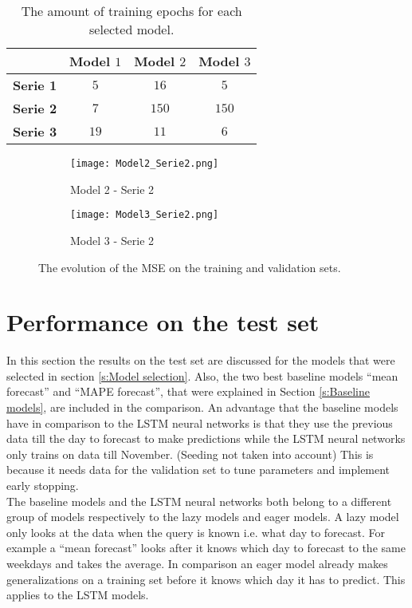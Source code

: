 \begin{table}[h]
	\centering
	\begin{tabular}{@{}l|ccc@{}} \toprule
				         & \textbf{Model $ 1 $} & \textbf{Model $ 2 $} & \textbf{Model $ 3 $}\\\midrule
		\textbf{Serie 1} & $5 $&$ 16$  & $5 $\\
		\textbf{Serie 2} & $7 $&$ 150 $  & $150$\\
		\textbf{Serie 3} & $19 $&$ 11 $  & $6$\\\bottomrule
	\end{tabular}
	\caption{The amount of training epochs for each selected model.}
	\label{tab:summ_model_selection}
\end{table}

\begin{figure}	 	
	\centering
	\begin{subfigure}{0.49\textwidth}
	\texttt{[image: Model2\_Serie2.png]}
	\caption{Model 2 - Serie 2}
	\end{subfigure}	
	\begin{subfigure}{0.49\textwidth}
	\texttt{[image: Model3\_Serie2.png]}
	\caption{Model 3 - Serie 2}
	\end{subfigure}
	\caption{The evolution of the MSE on the training and validation sets.}
	\label{fig:training_validation}
\end{figure}



\section{Performance on the test set}
In this section the results on the test set are discussed for the models that were selected in section \ref{s:Model selection}. 
Also, the two best baseline models ``mean forecast'' and ``MAPE forecast'', that were explained in Section \ref{s:Baseline models}, are included in the comparison. An advantage that the baseline models have in comparison to the LSTM neural networks is that they use the previous data till the day to forecast to make predictions while the LSTM neural networks only trains on data till November. (Seeding not taken into account) This is because it needs data for the validation set to tune parameters and implement early stopping. \\

The baseline models and the LSTM neural networks both belong to a different group of models respectively to the lazy models and eager models. A lazy model only looks at the data when the query is known i.e. what day to forecast. For example a ``mean forecast'' looks after it knows which day to forecast to the same weekdays and takes the average. In comparison an eager model already makes generalizations on a training set before it knows which day it has to predict. This applies to the LSTM models.\\

